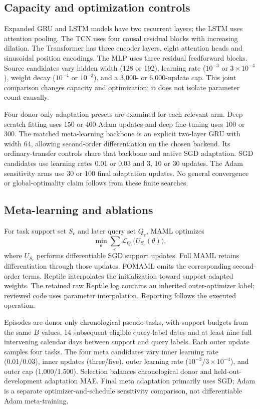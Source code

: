 \documentclass[conference]{IEEEtran}
\begin{document}
\subsection{Capacity and optimization controls}
Expanded GRU and LSTM models have two recurrent layers; the LSTM uses attention pooling. The TCN uses four causal residual blocks with increasing dilation. The Transformer has three encoder layers, eight attention heads and sinusoidal position encodings. The MLP uses three residual feedforward blocks. Source candidates vary hidden width (128 or 192), learning rate ($10^{-3}$ or $3\times10^{-4}$), weight decay ($10^{-4}$ or $10^{-3}$), and a 3,000- or 6,000-update cap. This joint comparison changes capacity and optimization; it does not isolate parameter count causally.

Four donor-only adaptation presets are examined for each relevant arm. Deep scratch fitting uses 150 or 400 Adam updates and deep fine-tuning uses 100 or 300. The matched meta-learning backbone is an explicit two-layer GRU with width 64, allowing second-order differentiation on the chosen backend. Its ordinary-transfer controls share that backbone and native SGD adaptation. SGD candidates use learning rates 0.01 or 0.03 and 3, 10 or 30 updates. The Adam sensitivity arms use 30 or 100 final adaptation updates. No general convergence or global-optimality claim follows from these finite searches.

\subsection{Meta-learning and ablations}
For task support set $S_c$ and later query set $Q_c$, MAML optimizes
\begin{equation}
\min_\theta \sum_c \mathcal{L}_{Q_c}\bigl(U_{S_c}(\theta)\bigr),
\end{equation}
where $U_{S_c}$ performs differentiable SGD support updates. Full MAML retains differentiation through those updates. FOMAML omits the corresponding second-order terms. Reptile interpolates the initialization toward support-adapted weights. The retained raw Reptile log contains an inherited outer-optimizer label; reviewed code uses parameter interpolation. Reporting follows the executed operation.

Episodes are donor-only chronological pseudo-tasks, with support budgets from the same $B$ values, 14 subsequent eligible query-label dates and at least nine full intervening calendar days between support and query labels. Each outer update samples four tasks. The four meta candidates vary inner learning rate (0.01/0.03), inner updates (three/five), outer learning rate ($10^{-3}/3\times10^{-4}$), and outer cap (1,000/1,500). Selection balances chronological donor and held-out-development adaptation MAE. Final meta adaptation primarily uses SGD; Adam is a separate optimizer-and-schedule sensitivity comparison, not differentiable Adam meta-training.
\end{document}
